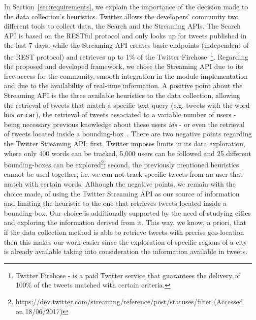 In Section~\ref{sec:requirements}, we explain the importance of the decision made to the data collection's heuristics. Twitter allows the developers' community two different tools to collect data, the Search and the Streaming APIs. The Search API is based on the RESTful protocol and only looks up for tweets published in the last 7 days, while the Streaming API creates basic endpoints (independent of the REST protocol) and retrieves up to 1\% of the Twitter Firehose~\footnote{Twitter Firehose - is a paid Twitter service that guarantees the delivery of 100\% of the tweets matched with certain criteria.}. Regarding the proposed and developed framework, we chose the Streaming API due to its free-access for the community, smooth integration in the module implementation and due to the availability of real-time information. A positive point about the Streaming API is the three available heuristics to the data collection, allowing the retrieval of tweets that match a specific text query (e.g. tweets with the word \texttt{bus} or \texttt{car}), the retrieval of tweets associated to a variable  number of users - being necessary previous knowledge about these users \textit{ids} - or even the retrieval of tweets located inside a bounding-box~\cite{mac2016effects}. There are two negative points regarding the Twitter Streaming API: first, Twitter imposes limits in its data exploration, where only 400 words can be tracked, 5,000 users can be followed and 25 different bounding-boxes can be explored\footnote{\url{https://dev.twitter.com/streaming/reference/post/statuses/filter} (Accessed on 18/06/2017)}; second, the previously mentioned heuristics cannot be used together, i.e. we can not track specific tweets from an user that match with certain words. Although the negative points, we remain with the choice made, of using the Twitter Streaming API as our source of information and limiting the heuristic to the one that retrieves tweets located inside a bounding-box. Our choice is additionally supported by the need of studying cities and exploring the information derived from it. This way, we know, a priori, that if the data collection method is able to retrieve tweets with precise geo-location then this makes our work easier since the exploration of specific regions of a city is already available taking into consideration the information available in tweets.

